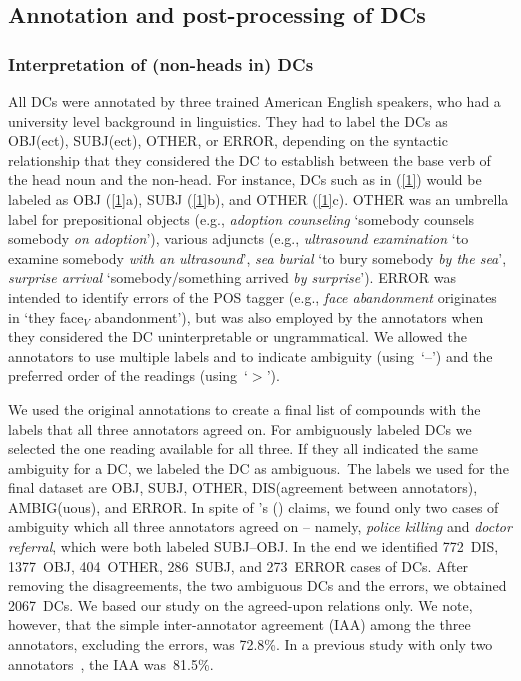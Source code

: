 \documentclass[output=paper]{langsci/langscibook}
\begin{document}
\subsection{Annotation and post-processing of DCs}\label{sec:annotation}
\subsubsection{Interpretation of (non-heads in) DCs}\label{sec:annotation:relation}
All DCs were annotated by three trained American English speakers, who had a university level background in  linguistics. They had to label the DCs as OBJ(ect), SUBJ(ect), OTHER, or ERROR, depending on the syntactic relationship that they considered the DC to establish between the base verb of the head noun and the non-head.
For instance, DCs such as in (\ref{1}) would be labeled as OBJ (\ref{1}a), SUBJ (\ref{1}b), and OTHER (\ref{1}c).
OTHER was an umbrella label for prepositional objects (e.g., \textit{adoption counseling} \lq somebody counsels somebody \textit{on adoption}\rq), various adjuncts (e.g., \textit{ultrasound examination} \lq to examine somebody \textit{with an ultrasound}\rq, \textit{sea burial} \lq to bury somebody \textit{by the sea}\rq, \textit{surprise arrival} \lq somebody/something arrived \textit{by surprise}\rq).
ERROR was  {intended} to identify errors of the POS tagger (e.g., \textit{face abandonment} originates in \lq they face$_V$ abandonment\rq), but was also employed by the annotators when they  considered the DC uninterpretable or  ungrammatical.
We allowed the annotators to use multiple labels and to indicate ambiguity (using~\lq --\rq) and the preferred order of the readings (using~\lq $>$\rq).

We used the original annotations to create a final list of compounds with the labels that all three annotators agreed on. 
For ambiguously labeled DCs we selected the one reading available for all three. 
If they all indicated the same ambiguity for a DC, we labeled the DC as ambiguous.\ 
The labels we used for the final dataset are OBJ, SUBJ, OTHER, DIS(agreement between annotators), AMBIG(uous), and ERROR.
In spite of \citeauthor{borer:13}'s (\citeyear{borer:13}) claims, we found only two cases of ambiguity which all three annotators agreed on -- namely, \textit{police killing} and \textit{doctor referral}, which were both labeled SUBJ--OBJ.
In the end we identified 772~DIS, 1377~OBJ, 404~OTHER, 286~SUBJ, and 273~ERROR cases of DCs.
After removing the disagreements, the two ambiguous DCs and the errors, we obtained 2067~DCs. We based our study on the agreed-upon relations only. We note, however, that the simple inter-annotator agreement (IAA) among the three annotators, excluding the errors, was 72.8\%. In a previous study with only two annotators~\citep{author:et:al:16}, the IAA was~81.5\%.
\end{document}

